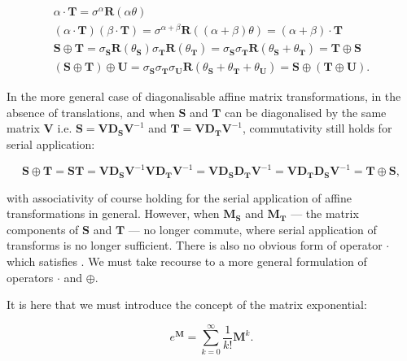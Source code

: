         \begin{gather}
            \alpha \cdot \mathbf{T} = \sigma^{\alpha}\mathbf{R}(\alpha\theta) \\
            (\alpha \cdot \mathbf{T})(\beta \cdot \mathbf{T}) = \sigma^{\alpha + \beta}\mathbf{R}((\alpha + \beta)\theta) = (\alpha + \beta) \cdot \mathbf{T} \\
			\mathbf{S} \oplus \mathbf{T} = \sigma_\mathbf{S}\mathbf{R}(\theta_\mathbf{S})\sigma_\mathbf{T}\mathbf{R}(\theta_\mathbf{T}) = \sigma_\mathbf{S}\sigma_\mathbf{T}\mathbf{R}(\theta_\mathbf{S} + \theta_\mathbf{T}) = \mathbf{T} \oplus \mathbf{S} \\
			(\mathbf{S} \oplus \mathbf{T}) \oplus \mathbf{U} = \sigma_\mathbf{S}\sigma_\mathbf{T}\sigma_\mathbf{U}\mathbf{R}(\theta_\mathbf{S} + \theta_\mathbf{T} + \theta_\mathbf{U}) = \mathbf{S} \oplus (\mathbf{T} \oplus \mathbf{U}).
        \end{gather}
		
		In the more general case of diagonalisable affine matrix transformations, in the absence of translations, and when $\mathbf{S}$ and $\mathbf{T}$ can be diagonalised by the same matrix $\mathbf{V}$ i.e. $\mathbf{S} = \mathbf{VD_SV}^{-1}$ and $\mathbf{T} = \mathbf{VD_TV}^{-1}$, commutativity still holds for serial application:
        
        \begin{equation}
			\mathbf{S} \oplus \mathbf{T} = \mathbf{ST} = \mathbf{VD_SV}^{-1}\mathbf{VD_TV}^{-1} = \mathbf{VD_SD_TV}^{-1} =\mathbf{VD_TD_SV}^{-1} = \mathbf{T} \oplus \mathbf{S},
        \end{equation}
        
        with associativity of course holding for the serial application of affine transformations in general. However, when $\mathbf{M_S}$ and $\mathbf{M_T}$ --- the matrix components of $\mathbf{S}$ and $\mathbf{T}$ --- no longer commute, where serial application of transforms is no longer sufficient. There is also no obvious form of operator $\cdot$ which satisfies . We must take recourse to a more general formulation of operators $\cdot$ and $\oplus$.
        
        It is here that we must introduce the concept of the matrix exponential:
        
        \begin{equation}
          e^{\mathbf{M}} = \sum_{k=0}^{\infty}\frac{1}{k!}\mathbf{M}^k. \label{eqn:matrix_exponential}
        \end{equation}
        
